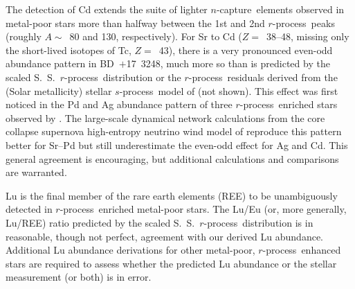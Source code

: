 \documentclass{emulateapj}
\def\bd{\mbox{BD~$+$17~3248}}
\def\rpro{\mbox{$r$-process}}
\def\spro{\mbox{$s$-process}}
\def\ncap{\mbox{$n$-capture}}
\begin{document}
The detection of Cd extends the suite of lighter \ncap\ elements
observed in metal-poor stars more than halfway between the
1st and 2nd \rpro\ peaks (roughly $A \sim$~80 and 130, respectively).
For Sr to Cd ($Z =$~38--48, 
missing only the short-lived isotopes of Tc, $Z =$~43), there is a
very pronounced even-odd abundance pattern in \bd, much more so
than is predicted by the scaled S.~S.\ \rpro\ distribution
or the \rpro\ residuals derived from the
(Solar metallicity)
stellar \spro\ model of \citealt{arlandini99} (not shown).
This effect was first noticed in the Pd and Ag abundance pattern
of three \rpro\ enriched stars observed by \citet{johnson02}.
The large-scale dynamical network calculations from the
core collapse supernova high-entropy neutrino wind model of \citet{farouqi09}
reproduce this pattern better for Sr--Pd but still
underestimate the even-odd effect for Ag and Cd.
This general agreement is encouraging, but
additional calculations and comparisons are warranted.

Lu is the final member of the rare earth elements (REE) to be
unambiguously detected in \rpro\ enriched metal-poor stars.
The Lu/Eu (or, more generally, Lu/REE) 
ratio predicted by the scaled S.~S.\ \rpro\ distribution
is in reasonable, though not perfect, agreement with our
derived Lu abundance.
Additional Lu abundance derivations for other metal-poor, 
\rpro\ enhanced stars are required to assess 
whether the predicted Lu abundance or the stellar measurement
(or both) is in error.
\end{document}
